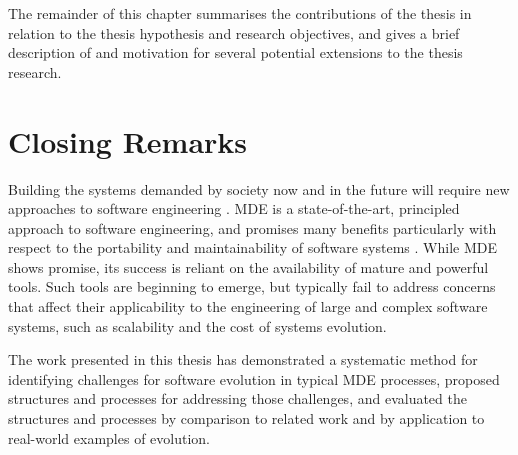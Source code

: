 The remainder of this chapter summarises the contributions of the thesis in relation to the thesis hypothesis and research objectives, and gives a brief description of and motivation for several potential extensions to the thesis research.






\section{Closing Remarks}
Building the systems demanded by society now and in the future will require new approaches to software engineering \cite{selic03pragmatics}. MDE is a state-of-the-art, principled approach to software engineering, and promises many benefits particularly with respect to the portability and maintainability of software systems \cite{kleppe03mda,frankel02mda}. While MDE shows promise, its success is reliant on the availability of mature and powerful tools. Such tools are beginning to emerge, but typically fail to address concerns that affect their applicability to the engineering of large and complex software systems, such as scalability and the cost of systems evolution.

The work presented in this thesis has demonstrated a systematic method for identifying challenges for software evolution in typical MDE processes, proposed structures and processes for addressing those challenges, and evaluated the structures and processes by comparison to related work and by application to real-world examples of evolution.